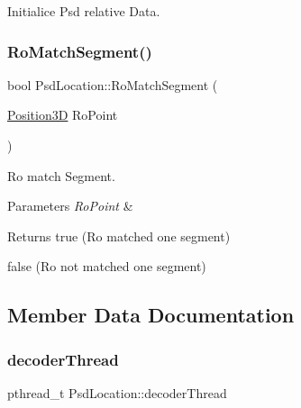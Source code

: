 Initialice Psd relative Data. 

\mbox{\label{class_psd_location_a8ff8c5e7cf8057f083f0a1d05fe49d56}} 
\subsubsection{\texorpdfstring{Ro\+Match\+Segment()}{RoMatchSegment()}}
{\footnotesize\ttfamily bool Psd\+Location\+::\+Ro\+Match\+Segment (\begin{DoxyParamCaption}\item[{\hyperlink{_geometric_calc_8h_aabfa1dd0400b274a48b4a45afbee0af4}{Position3D}}]{Ro\+Point }\end{DoxyParamCaption})}



Ro match Segment. 


\begin{DoxyParams}{Parameters}
{\em Ro\+Point} & \\
\hline
\end{DoxyParams}
\begin{DoxyReturn}{Returns}
true (Ro matched one segment) 

false (Ro not matched one segment) 
\end{DoxyReturn}


\subsection{Member Data Documentation}
\mbox{\label{class_psd_location_a5d7bd3fa135b850706b5e84ae7030e42}} 
\subsubsection{\texorpdfstring{decoder\+Thread}{decoderThread}}
{\footnotesize\ttfamily pthread\+\_\+t Psd\+Location\+::decoder\+Thread}

\mbox{\label{class_psd_location_a27cc6052f8ad1d5275665eeffcf4e27a}} 
